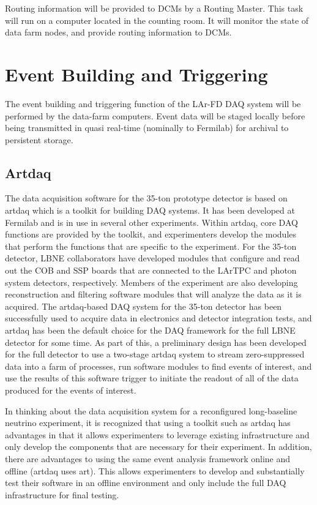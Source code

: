 Routing information will be provided to DCMs by a Routing Master.  This 
task will run on a computer located in the counting room.  It will monitor 
the state of data farm nodes, and provide routing information to DCMs.


\section{Event Building and Triggering}
\label{sec:v5-trig-evtbuild}

The event building and triggering function of the LAr-FD DAQ system 
will be performed by the data-farm computers.  Event data will be staged 
locally before being transmitted in quasi real-time (nominally to Fermilab) 
for archival to persistent storage. 

\subsection{Artdaq}

The data acquisition software for the 35-ton prototype detector is
based on artdaq which is a toolkit for building DAQ systems.  It has
been developed at Fermilab and is in use in several other experiments.
Within artdaq, core DAQ functions are provided by the toolkit, and
experimenters develop the modules that perform the functions that are
specific to the experiment.  For the 35-ton detector, LBNE
collaborators have developed modules that configure and read out the
COB and SSP boards that are connected to the LArTPC and photon system
detectors, respectively.  Members of the experiment are also
developing reconstruction and filtering software modules that will
analyze the data as it is acquired.  The artdaq-based DAQ system for
the 35-ton detector has been successfully used to acquire data in
electronics and detector integration tests, and artdaq has been the
default choice for the DAQ framework for the full LBNE detector for
some time.  As part of this, a preliminary design has been developed
for the full detector to use a two-stage artdaq system to stream
zero-suppressed data into a farm of processes, run software modules to
find events of interest, and use the results of this software trigger
to initiate the readout of all of the data produced for the events of
interest.

In thinking about the data acquisition system for a reconfigured
long-baseline neutrino experiment, it is recognized that using a
toolkit such as artdaq has advantages in that it allows experimenters
to leverage existing infrastructure and only develop the components
that are necessary for their experiment.  In addition, there are
advantages to using the same event analysis framework online and
offline (artdaq uses art).  This allows experimenters to develop and
substantially test their software in an offline environment and only
include the full DAQ infrastructure for final testing.

